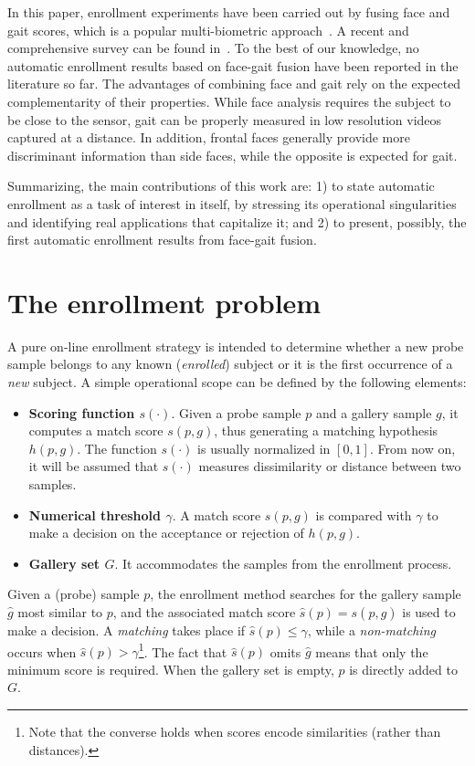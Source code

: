 \documentclass{llncs}
\begin{document}
In this paper, enrollment experiments have been carried out by fusing face and gait scores, which is a popular multi-biometric approach~\cite{Geng:2010,Hossain:2011}. %
A recent and comprehensive survey can be found in~\cite{Almohammad:2013}. To the best of our knowledge, no automatic enrollment results based on face-gait fusion have been reported in the literature so far. The advantages of combining face and gait rely on the expected complementarity of their properties. While face analysis requires the subject to be close to the sensor, gait can be properly measured in low resolution videos captured at a distance. In addition, frontal faces generally provide more discriminant information than side faces, while the opposite is expected for gait. 

Summarizing, the main contributions of this work are: 1) to state automatic enrollment as a task of interest in itself, by stressing its operational singularities and identifying real applications that capitalize it; and 2) to present, possibly, the first automatic enrollment results from face-gait fusion.

\section{The enrollment problem}

A pure on-line enrollment strategy is intended to determine whether a new probe sample belongs to any known (\emph{enrolled}) subject or 
it is the first occurrence of a \emph{new} subject. A simple operational scope can be defined 
by the following elements:
\begin{itemize}
\item \textbf{Scoring function $s(\cdot)$}. Given a probe sample $p$ and a gallery sample $g$, it computes a match score $s(p,g)$, thus generating a matching hypothesis $h(p,g)$. The function $s(\cdot)$ is usually normalized in $[0,1]$. From now on, it will be assumed that $s(\cdot)$ measures dissimilarity or distance between two samples. 
\item \textbf{Numerical threshold $\gamma$}. A match score $s(p,g)$ is compared with $\gamma$ to make a decision on the acceptance or rejection 
of $h(p,g)$. 
\item \textbf{Gallery set $G$}. It accommodates the samples from the enrollment process. 
\end{itemize}

Given a (probe) sample $p$, the enrollment method searches for the gallery sample $\hat g$ most similar to $p$, and the associated match score $\hat s(p)=s(p,\hat g)$ is used to make a decision. A \textit{matching} takes place if $\hat s(p)\le\gamma$, while a \textit{non-matching} occurs when $\hat s(p)>\gamma$\footnote{Note that the converse holds when scores encode similarities (rather than distances).}. The fact that $\hat s(p)$ omits $\hat g$ means that only the minimum score is required. When the gallery set is empty, $p$ is directly added to $G$.  
\end{document}
